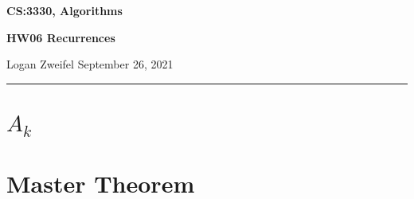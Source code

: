 \documentclass[11pt]{article}
\begin{document}
\thispagestyle{empty}

\begin{center}
\bf\large CS:3330, Algorithms
\end{center}

\begin{center}
\bf\large HW06 Recurrences  %
\end{center}

\noindent
Logan Zweifel     %
\hfill
September 26, 2021           %

\noindent
\rule{\textwidth}{1pt}

\medskip


\section{$A_k$} %









\section{Master Theorem} %
\end{document}
